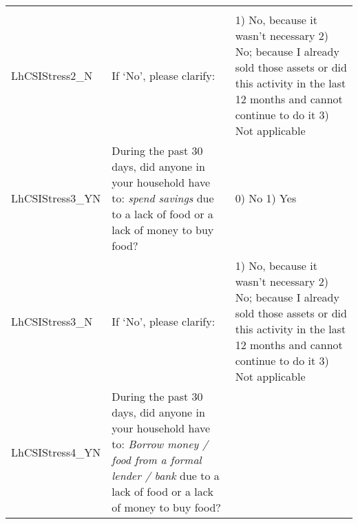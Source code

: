 \documentclass[
]{article}
\begin{document}
\begin{longtable}[]{@{}lll@{}}
\begin{minipage}[t]{0.27\columnwidth}
\end{minipage}\tabularnewline
\begin{minipage}[t]{0.15\columnwidth}\raggedright
LhCSIStress2\_N\strut
\end{minipage} & \begin{minipage}[t]{0.49\columnwidth}\raggedright
If `No', please clarify:\strut
\end{minipage} & \begin{minipage}[t]{0.27\columnwidth}\raggedright
1) No, because it wasn't necessary 2) No; because I already sold those assets or did this activity in the last 12 months and cannot continue to do it 3) Not applicable\strut
\end{minipage}\tabularnewline
\begin{minipage}[t]{0.15\columnwidth}\raggedright
LhCSIStress3\_YN\strut
\end{minipage} & \begin{minipage}[t]{0.49\columnwidth}\raggedright
During the past 30 days, did anyone in your household have to: \emph{spend savings} due to a lack of food or a lack of money to buy food?\strut
\end{minipage} & \begin{minipage}[t]{0.27\columnwidth}\raggedright
0) No 1) Yes\strut
\end{minipage}\tabularnewline
\begin{minipage}[t]{0.15\columnwidth}\raggedright
LhCSIStress3\_N\strut
\end{minipage} & \begin{minipage}[t]{0.49\columnwidth}\raggedright
If `No', please clarify:\strut
\end{minipage} & \begin{minipage}[t]{0.27\columnwidth}\raggedright
1) No, because it wasn't necessary 2) No; because I already sold those assets or did this activity in the last 12 months and cannot continue to do it 3) Not applicable\strut
\end{minipage}\tabularnewline
\begin{minipage}[t]{0.15\columnwidth}\raggedright
LhCSIStress4\_YN\strut
\end{minipage} & \begin{minipage}[t]{0.49\columnwidth}\raggedright
During the past 30 days, did anyone in your household have to: \emph{Borrow money / food from a formal lender / bank} due to a lack of food or a lack of money to buy food?\strut
\end{minipage} & \begin{minipage}[t]{0.27\columnwidth}\raggedright

\end{minipage}
\end{longtable}
\end{document}
